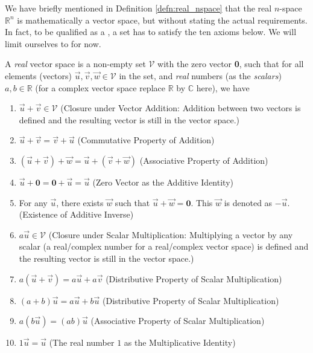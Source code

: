 We have briefly mentioned in Definition \ref{defn:real_nspace} that the real $n$-space $\mathbb{R}^n$ is mathematically a vector space, but without stating the actual requirements. In fact, to be qualified as a , a set has to satisfy the ten axioms below. We will limit ourselves to  for now.
\begin{defn}
\label{defn:realvecspaceaxiom}
A \textit{real} vector space is a non-empty set $\mathcal{V}$ with the zero vector \textbf{0}, such that for all elements (vectors) $\vec{u}, \vec{v}, \vec{w} \in \mathcal{V}$ in the set, and \textit{real} numbers (as the \textit{scalars}) $a, b \in \mathbb{R}$ (for a complex vector space replace $\mathbb{R}$ by $\mathbb{C}$ here), we have
\begin{enumerate}
\item $\vec{u} + \vec{v} \in \mathcal{V}$ (Closure under Vector Addition: Addition between two vectors is defined and the resulting vector is still in the vector space.)
\item $\vec{u} + \vec{v} = \vec{v} + \vec{u}$ (Commutative Property of Addition)
\item $(\vec{u} + \vec{v}) + \vec{w} = \vec{u} + (\vec{v} + \vec{w})$ (Associative Property of Addition)
\item $\vec{u} + \textbf{0} = \textbf{0} + \vec{u} = \vec{u}$ (Zero Vector as the Additive Identity)
\item For any $\vec{u}$, there exists $\vec{w}$ such that $\vec{u} + \vec{w} = \textbf{0}$. This $\vec{w}$ is denoted as $-\vec{u}$. (Existence of Additive Inverse)
\item $a\vec{u} \in \mathcal{V}$ (Closure under Scalar Multiplication: Multiplying a vector by any scalar (a real/complex number for a real/complex vector space) is defined and the resulting vector is still in the vector space.)
\item $a(\vec{u} + \vec{v}) = a\vec{u} + a\vec{v}$ (Distributive Property of Scalar Multiplication)
\item $(a+b)\vec{u} = a\vec{u} + b\vec{u}$ (Distributive Property of Scalar Multiplication)
\item $a(b\vec{u}) = (ab)\vec{u}$ (Associative Property of Scalar Multiplication)
\item $1\vec{u} = \vec{u}$ (The real number $1$ as the Multiplicative Identity)
\end{enumerate}
\end{defn}
